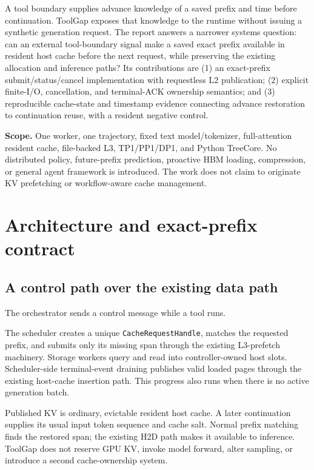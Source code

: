 \documentclass[10pt,a4paper]{article}
\newcommand{\code}[1]{\texttt{#1}}
\newcommand{\pagemark}{\newpage}
\begin{document}
A tool boundary supplies advance knowledge of a saved prefix and time before continuation. ToolGap exposes that knowledge to the runtime without issuing a synthetic generation request. The report answers a narrower systems question: can an external tool-boundary signal make a saved exact prefix available in resident host cache before the next request, while preserving the existing allocation and inference paths? Its contributions are (1) an exact-prefix submit/status/cancel implementation with requestless L2 publication; (2) explicit finite-I/O, cancellation, and terminal-ACK ownership semantics; and (3) reproducible cache-state and timestamp evidence connecting advance restoration to continuation reuse, with a resident negative control.

\textbf{Scope.} One worker, one trajectory, fixed text model/tokenizer, full-attention resident cache, file-backed L3, TP1/PP1/DP1, and Python TreeCore. No distributed policy, future-prefix prediction, proactive HBM loading, compression, or general agent framework is introduced. The work does not claim to originate KV prefetching or workflow-aware cache management.

\pagemark
\section{Architecture and exact-prefix contract}
\subsection{A control path over the existing data path}
The orchestrator sends a control message while a tool runs.

The scheduler creates a unique \code{CacheRequestHandle}, matches the requested prefix, and submits only its missing span through the existing L3-prefetch machinery. Storage workers query and read into controller-owned host slots. Scheduler-side terminal-event draining publishes valid loaded pages through the existing host-cache insertion path. This progress also runs when there is no active generation batch.

Published KV is ordinary, evictable resident host cache. A later continuation supplies its usual input token sequence and cache salt. Normal prefix matching finds the restored span; the existing H2D path makes it available to inference. ToolGap does not reserve GPU KV, invoke model forward, alter sampling, or introduce a second cache-ownership system.
\end{document}
